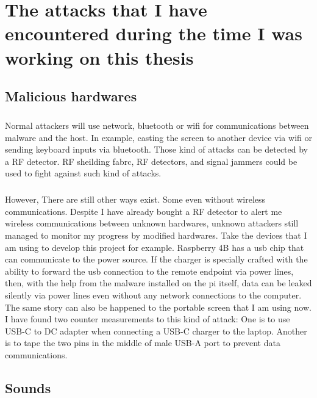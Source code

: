 \documentclass[mscthesis]{usiinfthesis}
\begin{document}
\chapter{The attacks that I have encountered during the time I was working on this thesis}

\section{Malicious hardwares}
\paragraph{}
Normal attackers will use network, bluetooth or wifi for communications between malware and the host. In example, casting the screen to another device via wifi or sending keyboard inputs via bluetooth. Those kind of attacks can be detected by a RF detector. RF sheilding fabrc, RF detectors, and signal jammers could be used to fight against such kind of attacks.
\paragraph{}
However, There are still other ways exist. Some even without wireless communications. Despite I have already bought a RF detector to alert me wireless communications between unknown hardwares, unknown attackers still managed to monitor my progress by modified hardwares. Take the devices that I am using to develop this project for example. Raspberry 4B has a usb chip that can communicate to the power source. If the charger is specially crafted with the ability to forward the usb connection to the remote endpoint via power lines, then, with the help from the malware installed on the pi itself, data can be leaked silently via power lines even without any network connections to the computer. The same story can also be happened to the portable screen that I am using now. I have found two counter measurements to this kind of attack: One is to use USB-C to DC adapter when connecting a USB-C charger to the laptop. Another is to tape the two pins in the middle of male USB-A port to prevent data communications.

\section{Sounds}
\end{document}
